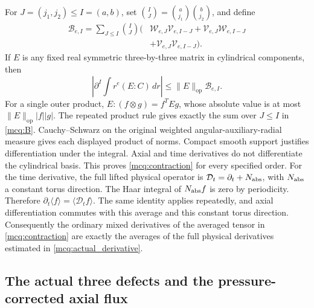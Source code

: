 For \(J=(j_1,j_2)\le I=(a,b)\), set
\(\binom IJ=\binom a{j_1}\binom b{j_2}\), and define
\begin{equation}\label{mcq:B}
\begin{split}
 \mathcal B_{e,I}=\sum_{J\le I}\binom IJ
 \bigl(&\mathcal W_{e,J}\mathcal V_{e,I-J}
       +\mathcal V_{e,J}\mathcal W_{e,I-J}\\
       &+\mathcal V_{e,J}\mathcal V_{e,I-J}\bigr).
\end{split}
\end{equation}
If \(E\) is any fixed real symmetric three-by-three matrix in
cylindrical components, then
\begin{equation}\label{mcq:contraction}
 \left|\partial^I\int r^e(E:C)\,dr\right|
       \le \|E\|_{\mathrm{op}}\mathcal B_{e,I}.
\end{equation}
For a single outer product,
\(E:(f\otimes g)=f^TEg\), whose absolute value is at most
\(\|E\|_{\mathrm{op}}|f||g|\). The repeated product rule gives exactly
the sum over \(J\le I\) in \eqref{mcq:B}. Cauchy--Schwarz on the
original weighted angular-auxiliary-radial measure gives each displayed
product of norms. Compact smooth support justifies differentiation
under the integral. Axial and time derivatives do not differentiate
the cylindrical basis. This proves \eqref{mcq:contraction} for every
specified order.
For the time derivative, the full lifted physical operator is
\(\mathcal D_t=\partial_t+N_{\rm abs}\), with \(N_{\rm abs}\) a
constant torus direction. The Haar integral of \(N_{\rm abs}f\) is
zero by periodicity. Therefore
\(\partial_t\langle f\rangle=\langle\mathcal D_tf\rangle\).
The same identity applies repeatedly, and axial differentiation commutes
with this average and this constant torus direction. Consequently the
ordinary mixed derivatives of the averaged tensor in
\eqref{mcq:contraction} are exactly the averages of the full physical
derivatives estimated in \eqref{mcq:actual_derivative}.

\subsection{The actual three defects and the pressure-corrected axial flux}

